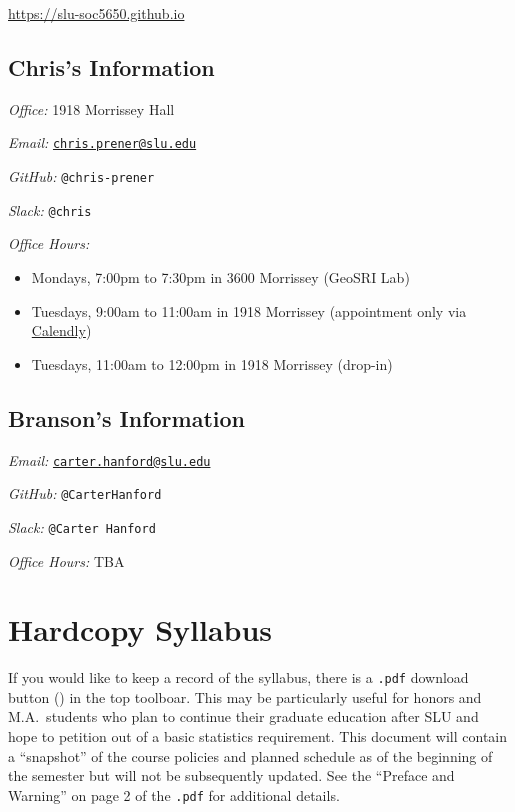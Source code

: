 \documentclass[
]{book}
\providecommand{\tightlist}{%
  \setlength{\itemsep}{0pt}\setlength{\parskip}{0pt}}
\begin{document}
\url{https://slu-soc5650.github.io}

\hypertarget{chriss-information}{%
\subsection*{Chris's Information}\label{chriss-information}}

\emph{Office:} 1918 Morrissey Hall

\emph{Email:} \href{mailto:chris.prener@slu.edu}{\nolinkurl{chris.prener@slu.edu}}

\emph{GitHub:} \texttt{@chris-prener}

\emph{Slack:} \texttt{@chris}

\emph{Office Hours:}

\begin{itemize}
\tightlist
\item
  Mondays, 7:00pm to 7:30pm in 3600 Morrissey (GeoSRI Lab)
\item
  Tuesdays, 9:00am to 11:00am in 1918 Morrissey (appointment only via \href{https://calendly.com/chris-prener}{Calendly})
\item
  Tuesdays, 11:00am to 12:00pm in 1918 Morrissey (drop-in)
\end{itemize}

\hypertarget{bransons-information}{%
\subsection*{Branson's Information}\label{bransons-information}}

\emph{Email:} \href{mailto:carter.hanford@slu.edu}{\nolinkurl{carter.hanford@slu.edu}}

\emph{GitHub:} \texttt{@CarterHanford}

\emph{Slack:} \texttt{@Carter\ Hanford}

\emph{Office Hours:} TBA

\hypertarget{hardcopy-syllabus}{%
\section*{Hardcopy Syllabus}\label{hardcopy-syllabus}}

If you would like to keep a record of the syllabus, there is a \texttt{.pdf} download button () in the top toolboar. This may be particularly useful for honors and M.A.~students who plan to continue their graduate education after SLU and hope to petition out of a basic statistics requirement. This document will contain a ``snapshot'' of the course policies and planned schedule as of the beginning of the semester but will not be subsequently updated. See the ``Preface and Warning'' on page 2 of the \texttt{.pdf} for additional details.
\end{document}
